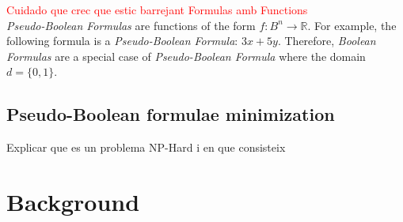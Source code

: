 \textcolor{red}{Cuidado que crec que estic barrejant Formulas amb Functions}\\

\emph{Pseudo-Boolean Formulas} are functions of the form $f:B^n \rightarrow \mathbb{R}$. For example, the following formula is a \emph{Pseudo-Boolean Formula}: $3x+5y$. Therefore, \emph{Boolean Formulas} are a special case of \emph{Pseudo-Boolean Formula} where the domain $d=\{0,1\}$.


\subsection{Pseudo-Boolean formulae minimization}
Explicar que es un problema NP-Hard i en que consisteix

\section{Background}

